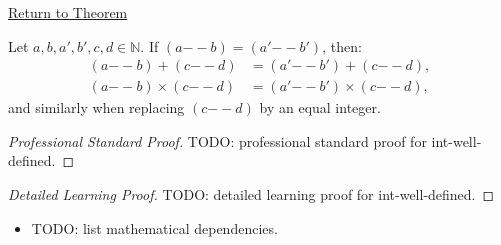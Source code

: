 \newpage
{}
\label{prf:int-well-defined}

\begin{remark*}[Return]
\hyperref[lem:int-well-defined]{Return to Theorem}
\end{remark*}

\begin{lemma*}
Let $a, b, a', b', c, d \in \mathbb{N}$.
If $(a {-\!\!-} b) = (a' {-\!\!-} b')$, then:
\begin{align*}
(a {-\!\!-} b) + (c {-\!\!-} d) &= (a' {-\!\!-} b') + (c {-\!\!-} d), \\
(a {-\!\!-} b) \times (c {-\!\!-} d) &= (a' {-\!\!-} b') \times (c {-\!\!-} d),
\end{align*}
and similarly when replacing $(c {-\!\!-} d)$ by an equal integer.
\end{lemma*}

\begin{proof}[Professional Standard Proof]
\LRAProofBodyStart
TODO: professional standard proof for int-well-defined.
\end{proof}

\begin{proof}[Detailed Learning Proof]
\LRAProofBodyStart
TODO: detailed learning proof for int-well-defined.
\end{proof}

\begin{remark*}
\end{remark*}

\begin{dependencies}
\begin{itemize}
  \item TODO: list mathematical dependencies.
\end{itemize}
\end{dependencies}

\clearpage
